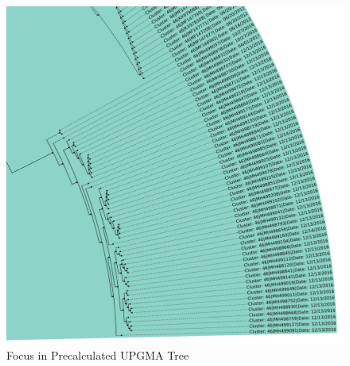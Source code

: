 \begin{figure}[!hbt]
    \centering
    \includegraphics[width=\textwidth]{Graphics/identical.pdf}
    \caption[Focus in Precalculated \Acrshort{UPGMA} Tree]{Focus in Precalculated \Acrshort{UPGMA} Tree}
    \label{fig:focus}
\end{figure}

